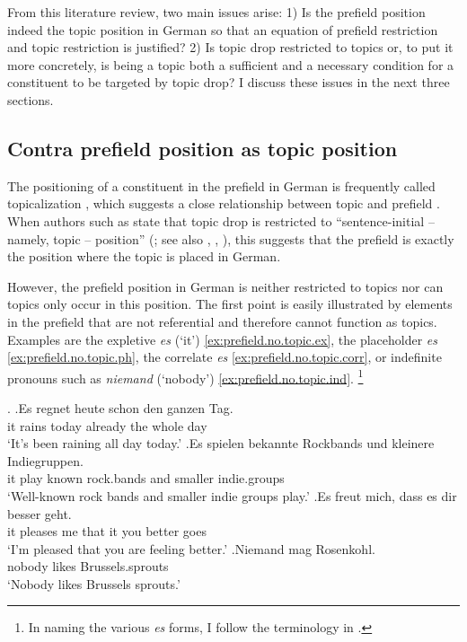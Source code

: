 From this literature review, two main issues arise:
1) Is the prefield position indeed the topic position in German so that an equation of prefield restriction and topic restriction is justified?
2) Is topic drop restricted to topics or, to put it more concretely, is being a topic both a sufficient and a necessary condition for a constituent to be targeted by topic drop?
I discuss these issues in the next three sections.

\subsection{Contra prefield position as topic position}\label{sec:topicality.prefield}
The positioning of a constituent in the prefield in German is frequently called topicalization \citep[e.g.,][]{cardinaletti1986}, which suggests a close relationship between topic and prefield \citep[e.g.,][]{pittner.berman2021}.
When authors such as \citet{huang1984} state that topic drop is restricted to ``sentence-initial -- namely, topic -- position'' (\cite[547]{huang1984}; see also \cite[198]{auer1993}, \cite[97]{jaensch2005}, \cite[272]{volodina2011}), this suggests that the prefield is exactly the position where the topic is placed in German.

However, the prefield position in German is neither restricted to topics nor can topics only occur in this position.
The first point is easily illustrated by elements in the prefield that are not referential and therefore cannot function as topics.
Examples are the expletive  \textit{es} (`it') \ref{ex:prefield.no.topic.ex}, the placeholder \textit{es} \ref{ex:prefield.no.topic.ph}, the correlate \textit{es} \ref{ex:prefield.no.topic.corr}, or indefinite pronouns such as \textit{niemand} (`nobody') \ref{ex:prefield.no.topic.ind}.%
\footnote{In naming the various \textit{es} forms, I follow the terminology in \citet[190--193]{eisenberg2020}.}%
%

\ex.\label{ex:prefield.no.topic}
\ag.\label{ex:prefield.no.topic.ex}Es regnet heute schon den ganzen Tag.\\
it rains today already the whole day\\
`It's been raining all day today.'
\bg.\label{ex:prefield.no.topic.ph}Es spielen bekannte Rockbands und kleinere Indiegruppen.\\
it play known rock.bands and smaller indie.groups\\
`Well-known rock bands and smaller indie groups play.'
\cg.\label{ex:prefield.no.topic.corr}Es freut mich, dass es dir besser geht.\\
it pleases me that it you better goes\\
`I'm pleased that you are feeling better.'
\dg.\label{ex:prefield.no.topic.ind}Niemand mag Rosenkohl.\\
nobody likes Brussels.sprouts\\
`Nobody likes Brussels sprouts.'

